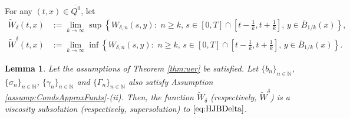 \documentclass[amscd,amssymb,11pt]{article}
\newtheorem{lemma}[theorem]{Lemma}
\numberwithin{theorem}{section}
\numberwithin{equation}{section}
\begin{document}
\medskip
For any $(t,x)\in \overline{Q^{0}}$, let
\begin{align*}
\widetilde{W}_{\delta}(t,x)&:=\lim_{k\rightarrow\infty}\sup\left\{ W_{\delta,n}(s,y):\,\,n\geq k,\,s\in[0,T]\cap\left[t-\frac{1}{k},t+\frac{1}{k}\right],\,y\in\overline{B}_{1/k}(x)\right\},\\
\widetilde{W}^{\delta}(t,x)&:= \lim_{k\rightarrow\infty}\inf\left\{W_{\delta,n}(s,y):\,\,n\geq k,\,s\in[0,T]\cap\left[t-\frac{1}{k},t+\frac{1}{k}\right],\,y\in\overline{B}_{1/k}(x)\right\}.
\end{align*}
\begin{lemma}\label{lem:VisSubSuperSolsWDelta}
Let the assumptions of Theorem \ref{thm:uer} be satisfied. Let $\{b_{n}\}_{n\in\mathbb{N}}$, $\{\sigma_{n}\}_{n\in\mathbb{N}}$, $\{\gamma_{n}\}_{n\in\mathbb{N}}$ and $\{\Gamma_{n}\}_{n\in\mathbb{N}}$ also satisfy Assumption \ref{assump:CondsApproxFunts}-(ii). Then, the function $\widetilde{W}_{\delta}$ (respectively, $\widetilde{W}^{\delta}$) is a viscosity subsolution (respectively, supersolution) to $\eqref{eq:HJBDelta}$.
\end{lemma}
\end{document}
